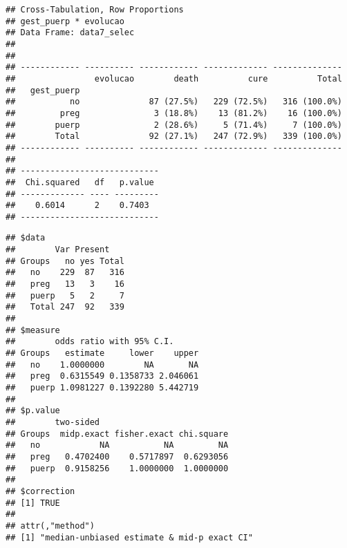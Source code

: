 \documentclass[
]{article}
\newenvironment{Shaded}{\begin{snugshade}}{\end{snugshade}}
\newcommand{\DataTypeTok}[1]{\textcolor[rgb]{0.13,0.29,0.53}{#1}}
\newcommand{\KeywordTok}[1]{\textcolor[rgb]{0.13,0.29,0.53}{\textbf{#1}}}
\newcommand{\NormalTok}[1]{#1}
\newcommand{\OperatorTok}[1]{\textcolor[rgb]{0.81,0.36,0.00}{\textbf{#1}}}
\newcommand{\OtherTok}[1]{\textcolor[rgb]{0.56,0.35,0.01}{#1}}
\newcommand{\StringTok}[1]{\textcolor[rgb]{0.31,0.60,0.02}{#1}}
\begin{document}
\begin{Shaded}
\end{Shaded}

\begin{verbatim}
## Cross-Tabulation, Row Proportions  
## gest_puerp * evolucao  
## Data Frame: data7_selec  
## 
## 
## ------------ ---------- ------------ ------------- --------------
##                evolucao        death          cure          Total
##   gest_puerp                                                     
##           no              87 (27.5%)   229 (72.5%)   316 (100.0%)
##         preg               3 (18.8%)    13 (81.2%)    16 (100.0%)
##        puerp               2 (28.6%)     5 (71.4%)     7 (100.0%)
##        Total              92 (27.1%)   247 (72.9%)   339 (100.0%)
## ------------ ---------- ------------ ------------- --------------
## 
## ----------------------------
##  Chi.squared   df   p.value 
## ------------- ---- ---------
##    0.6014      2    0.7403  
## ----------------------------
\end{verbatim}

\begin{Shaded}
\end{Shaded}

\begin{verbatim}
## $data
##        Var Present
## Groups   no yes Total
##   no    229  87   316
##   preg   13   3    16
##   puerp   5   2     7
##   Total 247  92   339
## 
## $measure
##        odds ratio with 95% C.I.
## Groups   estimate     lower    upper
##   no    1.0000000        NA       NA
##   preg  0.6315549 0.1358733 2.046061
##   puerp 1.0981227 0.1392280 5.442719
## 
## $p.value
##        two-sided
## Groups  midp.exact fisher.exact chi.square
##   no            NA           NA         NA
##   preg   0.4702400    0.5717897  0.6293056
##   puerp  0.9158256    1.0000000  1.0000000
## 
## $correction
## [1] TRUE
## 
## attr(,"method")
## [1] "median-unbiased estimate & mid-p exact CI"
\end{verbatim}
\end{document}
